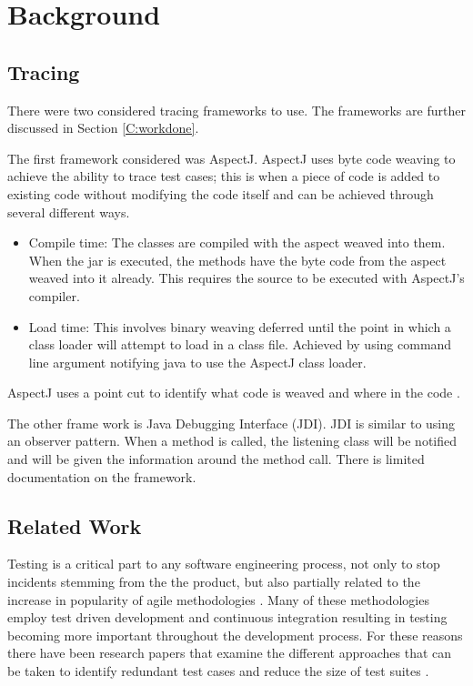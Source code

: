 \chapter{Background}\label{C:related}

\section{Tracing}

There were two considered tracing frameworks to use. The frameworks are further discussed in Section \ref{C:workdone}.

The first framework considered was AspectJ. AspectJ uses byte code weaving to achieve the ability to trace test cases; this is when a piece of code is added to existing code without modifying the code itself and can be achieved through several different ways.

\begin{itemize}
\item Compile time:
The classes are compiled with the aspect weaved into them. When the jar is executed, the methods have the byte code from the aspect weaved into it already. This requires the source to be executed with AspectJ's compiler.
\item Load time:
This involves binary weaving deferred until the point in which a class loader will attempt to load in a class file. Achieved by using command line argument notifying java to use the AspectJ class loader.
\end{itemize}

AspectJ uses a point cut to identify what code is weaved and where in the code \cite{aspectwiki}. 

The other frame work is Java Debugging Interface (JDI). JDI is similar to using an observer pattern. When a method is called, the listening class will be notified and will be given the information around the method call. There is limited documentation on the framework.



\section{Related Work}
Testing is a critical part to any software engineering process, not only to stop incidents stemming from the the product, but also partially related to the increase in popularity of agile methodologies \cite{chaos}. Many of these methodologies employ test driven development and continuous integration resulting in testing becoming more important throughout the development process. For these reasons there have been research papers that examine the different approaches that can be taken to identify redundant test cases and reduce the size of test suites \cite{wong1995effect, wong1999test, rothermel1998empirical, rothermel2002empirical,koochakzadeh2009test,zhang2011empirical,li2008static}.

